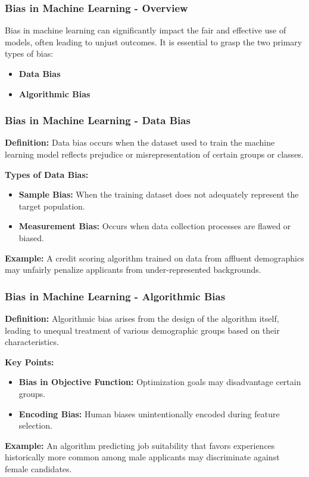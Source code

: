 \documentclass[aspectratio=169]{beamer}
\begin{document}
\begin{frame}[fragile]
    \frametitle{Bias in Machine Learning - Overview}
    Bias in machine learning can significantly impact the fair and effective use of models, often leading to unjust outcomes. 
    It is essential to grasp the two primary types of bias: 
    \begin{itemize}
        \item \textbf{Data Bias}
        \item \textbf{Algorithmic Bias}
    \end{itemize}
\end{frame}

\begin{frame}[fragile]
    \frametitle{Bias in Machine Learning - Data Bias}
    \textbf{Definition:} Data bias occurs when the dataset used to train the machine learning model reflects prejudice or misrepresentation of certain groups or classes.
    
    \textbf{Types of Data Bias:}
    \begin{itemize}
        \item \textbf{Sample Bias:} When the training dataset does not adequately represent the target population. 
        \item \textbf{Measurement Bias:} Occurs when data collection processes are flawed or biased.
    \end{itemize}
    
    \textbf{Example:} A credit scoring algorithm trained on data from affluent demographics may unfairly penalize applicants from under-represented backgrounds.
\end{frame}

\begin{frame}[fragile]
    \frametitle{Bias in Machine Learning - Algorithmic Bias}
    \textbf{Definition:} Algorithmic bias arises from the design of the algorithm itself, leading to unequal treatment of various demographic groups based on their characteristics.
    
    \textbf{Key Points:}
    \begin{itemize}
        \item \textbf{Bias in Objective Function:} Optimization goals may disadvantage certain groups.
        \item \textbf{Encoding Bias:} Human biases unintentionally encoded during feature selection.
    \end{itemize}
    
    \textbf{Example:} An algorithm predicting job suitability that favors experiences historically more common among male applicants may discriminate against female candidates.
\end{frame}
\end{document}
